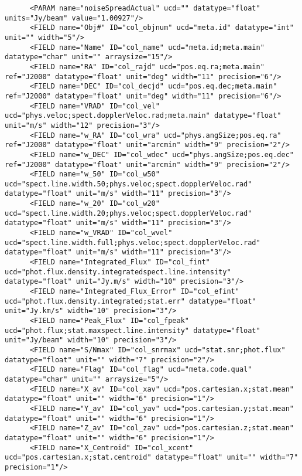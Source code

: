 {\begin{verbatim}
      <PARAM name="noiseSpreadActual" ucd="" datatype="float" units="Jy/beam" value="1.00927"/>
      <FIELD name="Obj#" ID="col_objnum" ucd="meta.id" datatype="int" unit="" width="5"/>
      <FIELD name="Name" ID="col_name" ucd="meta.id;meta.main" datatype="char" unit="" arraysize="15"/>
      <FIELD name="RA" ID="col_rajd" ucd="pos.eq.ra;meta.main" ref="J2000" datatype="float" unit="deg" width="11" precision="6"/>
      <FIELD name="DEC" ID="col_decjd" ucd="pos.eq.dec;meta.main" ref="J2000" datatype="float" unit="deg" width="11" precision="6"/>
      <FIELD name="VRAD" ID="col_vel" ucd="phys.veloc;spect.dopplerVeloc.rad;meta.main" datatype="float" unit="m/s" width="12" precision="3"/>
      <FIELD name="w_RA" ID="col_wra" ucd="phys.angSize;pos.eq.ra" ref="J2000" datatype="float" unit="arcmin" width="9" precision="2"/>
      <FIELD name="w_DEC" ID="col_wdec" ucd="phys.angSize;pos.eq.dec" ref="J2000" datatype="float" unit="arcmin" width="9" precision="2"/>
      <FIELD name="w_50" ID="col_w50" ucd="spect.line.width.50;phys.veloc;spect.dopplerVeloc.rad" datatype="float" unit="m/s" width="11" precision="3"/>
      <FIELD name="w_20" ID="col_w20" ucd="spect.line.width.20;phys.veloc;spect.dopplerVeloc.rad" datatype="float" unit="m/s" width="11" precision="3"/>
      <FIELD name="w_VRAD" ID="col_wvel" ucd="spect.line.width.full;phys.veloc;spect.dopplerVeloc.rad" datatype="float" unit="m/s" width="11" precision="3"/>
      <FIELD name="Integrated_Flux" ID="col_fint" ucd="phot.flux.density.integratedspect.line.intensity" datatype="float" unit="Jy.m/s" width="10" precision="3"/>
      <FIELD name="Integrated_Flux_Error" ID="col_efint" ucd="phot.flux.density.integrated;stat.err" datatype="float" unit="Jy.km/s" width="10" precision="3"/>
      <FIELD name="Peak_Flux" ID="col_fpeak" ucd="phot.flux;stat.maxspect.line.intensity" datatype="float" unit="Jy/beam" width="10" precision="3"/>
      <FIELD name="S/Nmax" ID="col_snrmax" ucd="stat.snr;phot.flux" datatype="float" unit="" width="7" precision="2"/>
      <FIELD name="Flag" ID="col_flag" ucd="meta.code.qual" datatype="char" unit="" arraysize="5"/>
      <FIELD name="X_av" ID="col_xav" ucd="pos.cartesian.x;stat.mean" datatype="float" unit="" width="6" precision="1"/>
      <FIELD name="Y_av" ID="col_yav" ucd="pos.cartesian.y;stat.mean" datatype="float" unit="" width="6" precision="1"/>
      <FIELD name="Z_av" ID="col_zav" ucd="pos.cartesian.z;stat.mean" datatype="float" unit="" width="6" precision="1"/>
      <FIELD name="X_Centroid" ID="col_xcent" ucd="pos.cartesian.x;stat.centroid" datatype="float" unit="" width="7" precision="1"/>

\end{verbatim}}
